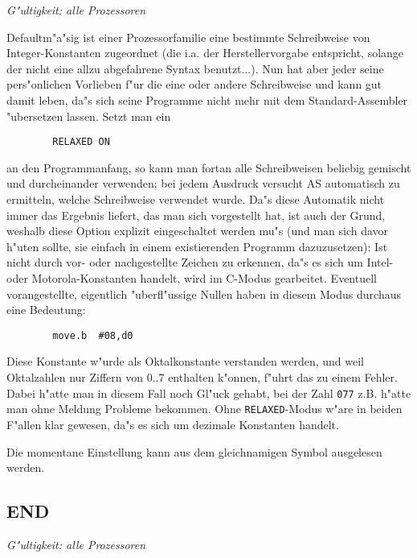 \documentclass[12pt,a4paper,twoside]{report}
\makeatletter
\newcommand{\tty}[1]{{\tt #1}}
\newcommand{\ttindex}[1]{\index{#1@{\tt #1}}}
\makeatother
\begin{document}
{{\em G"ultigkeit: alle Prozessoren}

Defaultm"a"sig ist einer Prozessorfamilie eine bestimmte Schreibweise
von Integer-Konstanten zugeordnet (die i.a. der Herstellervorgabe
entspricht, solange der nicht eine allzu abgefahrene Syntax benutzt...).
Nun hat aber jeder seine pers"onlichen Vorlieben f"ur die eine oder
andere Schreibweise und kann gut damit leben, da"s sich seine Programme
nicht mehr mit dem Standard-Assembler "ubersetzen lassen. Setzt man ein
\begin{verbatim}
        RELAXED ON
\end{verbatim}
an den Programmanfang, so kann man fortan alle Schreibweisen beliebig
gemischt und durcheinander verwenden; bei jedem Ausdruck versucht AS
automatisch zu ermitteln, welche Schreibweise verwendet wurde.  Da"s
diese Automatik nicht immer das Ergebnis liefert, das man sich vorgestellt
hat, ist auch der Grund, weshalb diese Option explizit eingeschaltet
werden mu"s (und man sich davor h"uten sollte, sie einfach in einem
existierenden Programm dazuzusetzen): Ist nicht durch vor- oder
nachgestellte Zeichen zu erkennen, da"s es sich um Intel- oder
Motorola-Konstanten handelt, wird im C-Modus gearbeitet.  Eventuell
vorangestellte, eigentlich "uberfl"ussige Nullen haben in diesem Modus
durchaus eine Bedeutung:
\begin{verbatim}
        move.b  #08,d0
\end{verbatim}
Diese Konstante w"urde als Oktalkonstante verstanden werden, und weil
Oktalzahlen nur Ziffern von 0..7 enthalten k"onnen, f"uhrt das zu einem
Fehler.  Dabei h"atte man in diesem Fall noch Gl"uck gehabt, bei der
Zahl \tty{077} z.B. h"atte man ohne Meldung Probleme bekommen.  Ohne
\tty{RELAXED}-Modus w"are in beiden F"allen klar gewesen, da"s es sich
um dezimale Konstanten handelt.
\par
Die momentane Einstellung kann aus dem gleichnamigen Symbol ausgelesen
werden.


\subsection{END}
\ttindex{END}

{\em G"ultigkeit: alle Prozessoren}

}
\end{document}
